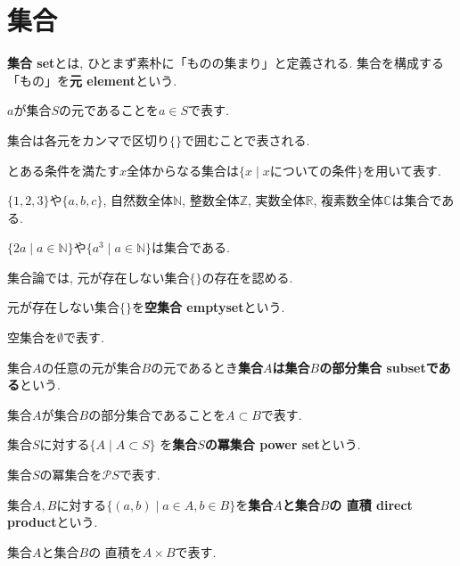 \section{集合}
{\bf 集合 set}とは, ひとまず素朴に「ものの集まり」と定義される. 集合を構成する「もの」を{\bf 元 element}という.
\begin{Notation}
$a$が集合$S$の元であることを$a\in S$で表す.
\end{Notation}
\begin{Notation}
集合は各元をカンマで区切り$\{\}$で囲むことで表される. 
\end{Notation}
\begin{Notation}
とある条件を満たす$x$全体からなる集合は$\{x\mid x\text{についての条件}\}$を用いて表す.
\end{Notation}
\begin{example}$\{1,2,3\}$や$\{a,b,c\}$, 自然数全体$\mathbb{N}$, 整数全体$\mathbb{Z}$, 実数全体$\mathbb{R}$, 複素数全体$\mathbb{C}$は集合である.
\end{example}
\begin{example}
$\{2a\mid a\in\mathbb{N}\}$や$\{a^3\mid a\in\mathbb{N}\}$は集合である.
\end{example}
集合論では, 元が存在しない集合$\{\}$の存在を認める.
\begin{Def}
元が存在しない集合$\{\}$を{\bf 空集合 emptyset}という.
\end{Def}
\begin{Notation}
空集合を$\emptyset$で表す.
\end{Notation}
\begin{Def}
集合$A$の任意の元が集合$B$の元であるとき{\bf 集合$A$は集合$B$の部分集合 subsetである}という.  
\end{Def}
\begin{Notation}
集合$A$が集合$B$の部分集合であることを$A\subset B$で表す.
\end{Notation}
\begin{Def}
集合$S$に対する$\{A\mid A\subset S\}$
を{\bf 集合$S$の冪集合 power set}という.
\end{Def}
\begin{Notation}
集合$S$の冪集合を$\mathcal{P}S$で表す.
\end{Notation}
\begin{Def}
集合$A,B$に対する$\{(a,b)\mid a\in A, b\in B\}$を{\bf 集合$A$と集合$B$の
直積 direct product}という.
\end{Def}
\begin{Notation}
集合$A$と集合$B$の
直積を$A\times B$で表す.
\end{Notation}
\begin{comment}
実は, 集合を「ものの集まり」と素朴に定義することは, 矛盾を孕んでいる. この矛盾を避けるための議論はのちに行う. 
また, 集合論の公理には立ち入らないこととする.
\end{comment}
